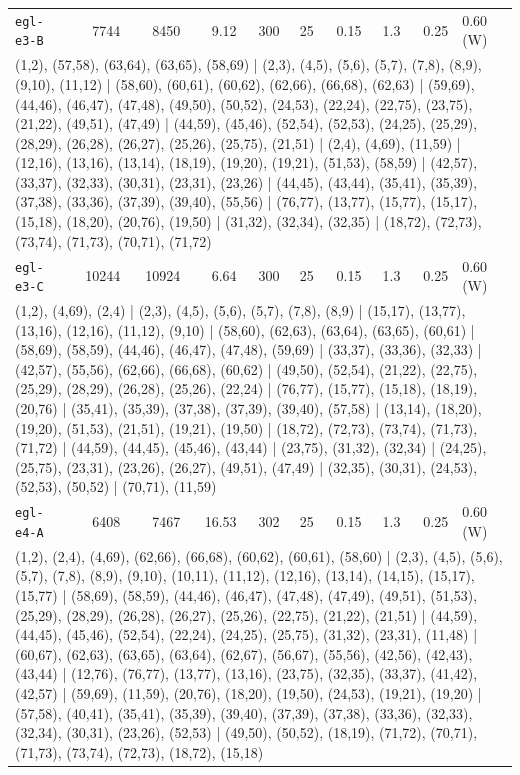 \begin{longtable}{lrrrrrrrrl}
\texttt{egl-e3-B} & 7744 & 8450 & 9.12 & 300 & 25 & 0.15 & 1.3 & 0.25 & 0.60\,(W) \\
\multicolumn{10}{p{0.96\linewidth}}{\tiny\raggedright\arraybackslash (1,2), (57,58), (63,64), (63,65), (58,69) | (2,3), (4,5), (5,6), (5,7), (7,8), (8,9), (9,10), (11,12) | (58,60), (60,61), (60,62), (62,66), (66,68), (62,63) | (59,69), (44,46), (46,47), (47,48), (49,50), (50,52), (24,53), (22,24), (22,75), (23,75), (21,22), (49,51), (47,49) | (44,59), (45,46), (52,54), (52,53), (24,25), (25,29), (28,29), (26,28), (26,27), (25,26), (25,75), (21,51) | (2,4), (4,69), (11,59) | (12,16), (13,16), (13,14), (18,19), (19,20), (19,21), (51,53), (58,59) | (42,57), (33,37), (32,33), (30,31), (23,31), (23,26) | (44,45), (43,44), (35,41), (35,39), (37,38), (33,36), (37,39), (39,40), (55,56) | (76,77), (13,77), (15,77), (15,17), (15,18), (18,20), (20,76), (19,50) | (31,32), (32,34), (32,35) | (18,72), (72,73), (73,74), (71,73), (70,71), (71,72)} \\[2pt]
\texttt{egl-e3-C} & 10244 & 10924 & 6.64 & 300 & 25 & 0.15 & 1.3 & 0.25 & 0.60\,(W) \\
\multicolumn{10}{p{0.96\linewidth}}{\tiny\raggedright\arraybackslash (1,2), (4,69), (2,4) | (2,3), (4,5), (5,6), (5,7), (7,8), (8,9) | (15,17), (13,77), (13,16), (12,16), (11,12), (9,10) | (58,60), (62,63), (63,64), (63,65), (60,61) | (58,69), (58,59), (44,46), (46,47), (47,48), (59,69) | (33,37), (33,36), (32,33) | (42,57), (55,56), (62,66), (66,68), (60,62) | (49,50), (52,54), (21,22), (22,75), (25,29), (28,29), (26,28), (25,26), (22,24) | (76,77), (15,77), (15,18), (18,19), (20,76) | (35,41), (35,39), (37,38), (37,39), (39,40), (57,58) | (13,14), (18,20), (19,20), (51,53), (21,51), (19,21), (19,50) | (18,72), (72,73), (73,74), (71,73), (71,72) | (44,59), (44,45), (45,46), (43,44) | (23,75), (31,32), (32,34) | (24,25), (25,75), (23,31), (23,26), (26,27), (49,51), (47,49) | (32,35), (30,31), (24,53), (52,53), (50,52) | (70,71), (11,59)} \\[2pt]
\texttt{egl-e4-A} & 6408 & 7467 & 16.53 & 302 & 25 & 0.15 & 1.3 & 0.25 & 0.60\,(W) \\
\multicolumn{10}{p{0.96\linewidth}}{\tiny\raggedright\arraybackslash (1,2), (2,4), (4,69), (62,66), (66,68), (60,62), (60,61), (58,60) | (2,3), (4,5), (5,6), (5,7), (7,8), (8,9), (9,10), (10,11), (11,12), (12,16), (13,14), (14,15), (15,17), (15,77) | (58,69), (58,59), (44,46), (46,47), (47,48), (47,49), (49,51), (51,53), (25,29), (28,29), (26,28), (26,27), (25,26), (22,75), (21,22), (21,51) | (44,59), (44,45), (45,46), (52,54), (22,24), (24,25), (25,75), (31,32), (23,31), (11,48) | (60,67), (62,63), (63,65), (63,64), (62,67), (56,67), (55,56), (42,56), (42,43), (43,44) | (12,76), (76,77), (13,77), (13,16), (23,75), (32,35), (33,37), (41,42), (42,57) | (59,69), (11,59), (20,76), (18,20), (19,50), (24,53), (19,21), (19,20) | (57,58), (40,41), (35,41), (35,39), (39,40), (37,39), (37,38), (33,36), (32,33), (32,34), (30,31), (23,26), (52,53) | (49,50), (50,52), (18,19), (71,72), (70,71), (71,73), (73,74), (72,73), (18,72), (15,18)} \\[2pt]

\end{longtable}
